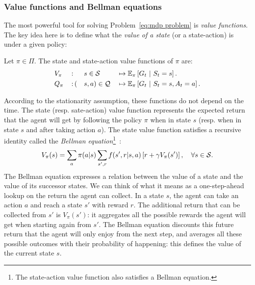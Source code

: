 		\subsubsection{Value functions and Bellman equations} 
			The most powerful tool for solving Problem~\eqref{eq:mdp problem} is\emph{ value functions}. The key idea here is to define what the\emph{ value of a state} (or a state-action) is under a given policy:
			\begin{definition}
				Let $\pi\in\Pi$. The state and state-action value functions of $\pi$ are:
				\begin{alignat}{7}
				& V_\pi\,&:&\, &s&\in\S & & \mapsto \expected_\pi\left[G_t~\middle|~S_t = s\right]. \label{eq:state value} \\
				& Q_\pi\,&:&\, (&s&, a)\in\Q & & \mapsto \expected_\pi\left[G_t~\middle|~S_t = s, A_t = a\right]. \label{eq:stateaction value}
				\end{alignat}
			\end{definition}
			According to the stationarity assumption, these functions do not depend on the time. The state (resp. sate-action) value function represents the expected return that the agent will get by following the policy $\pi$ when in state $s$ (resp. when in state $s$ and after taking action $a$). The state value function satisfies a recursive identity called the\emph{ Bellman equation}\footnote{The state-action value function also satisfies a Bellman equation.}~\cite[Section\,3.5]{sutton2018reinforcement}:
			\begin{equation}
				V_\pi(s) = \sum_{a} \pi(a|s) \sum_{s', r}f(s', r |s, a)\left[r + \gamma V_\pi(s')\right],\quad \forall s\in\S.
			\end{equation}
			The Bellman equation expresses a relation between the value of a state and the value of its successor states. We can think of what it means as a one-step-ahead lookup on the return the agent can collect. In a state $s$, the agent can take an action $a$ and reach a state $s'$ with reward $r$. The additional return that can be collected from $s'$ is $V_\pi(s')$: it aggregates all the possible rewards the agent will get when starting again from $s'$. The Bellman equation discounts this future return that the agent will only enjoy from the next step, and averages all these possible outcomes with their probability of happening: this defines the value of the current state $s$.
